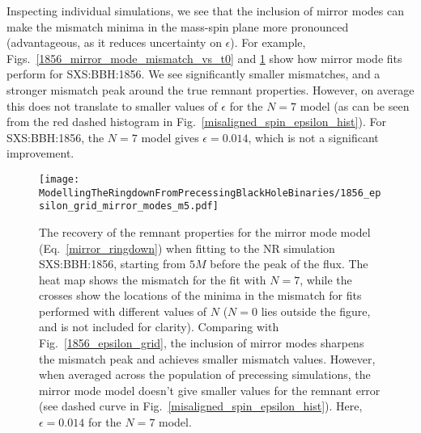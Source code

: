 Inspecting individual simulations, we see that the inclusion of mirror modes can make the mismatch minima in the mass-spin plane more pronounced (advantageous, as it reduces uncertainty on $\epsilon$). For example, Figs.~\ref{1856_mirror_mode_mismatch_vs_t0} and \ref{1856_mirror_mode_epsilon_grid} show how mirror mode fits perform for SXS:BBH:1856. 
We see significantly smaller mismatches, and a stronger mismatch peak around the true remnant properties. However, on average this does not translate to smaller values of $\epsilon$ for the $N=7$ model (as can be seen from the red dashed histogram in Fig.~\ref{misaligned_spin_epsilon_hist}). For SXS:BBH:1856, the $N=7$ model gives $\epsilon = 0.014$, which is not a significant improvement.

\begin{figure}[t]
    \centering
    \texttt{[image: ModellingTheRingdownFromPrecessingBlackHoleBinaries/1856\_epsilon\_grid\_mirror\_modes\_m5.pdf]}
    \caption[Recovery of the SXS:BBH:1856 remnant properties using the mirror-mode model starting from $5M$ before the peak of the GW energy flux]{ 
    The recovery of the remnant properties for the mirror mode model (Eq.~\ref{mirror_ringdown}) when fitting to the NR simulation SXS:BBH:1856, starting from $5M$ before the peak of the flux. The heat map shows the mismatch for the fit with $N=7$, while the crosses show the locations of the minima in the mismatch for fits performed with different values of $N$ ($N=0$ lies outside the figure, and is not included for clarity). Comparing with Fig.~\ref{1856_epsilon_grid}, the inclusion of mirror modes sharpens the mismatch peak and achieves smaller mismatch values. However, when averaged across the population of precessing simulations, the mirror mode model doesn't give smaller values for the remnant error (see dashed curve in Fig.~\ref{misaligned_spin_epsilon_hist}). Here, $\epsilon = 0.014$ for the $N=7$ model.
    }
	\label{1856_mirror_mode_epsilon_grid}
\end{figure}

